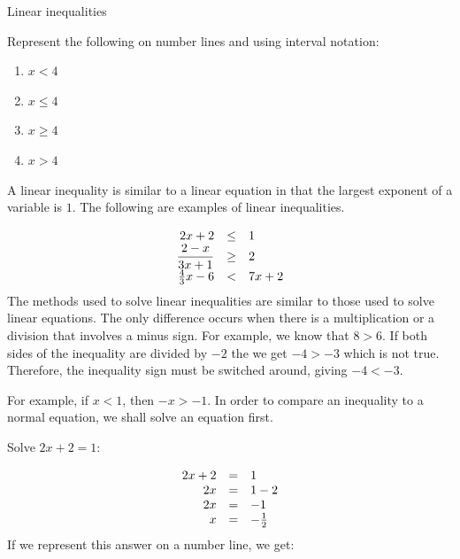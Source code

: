 \begin{activity}{Linear inequalities}
{
Represent the following on number lines and using interval notation:
\begin{enumerate}[noitemsep, label=\textbf{\arabic*}. ] 
\item $x<4$
\item $x\leq 4$
\item $x\geq 4$
\item $x>4$
\end{enumerate}
}
\end{activity}
A linear inequality is similar to a linear equation in that the largest exponent of a variable is $1$. The following are examples of linear inequalities.\par 

\begin{equation*}
\begin{array}{ccc}\hfill 2x+2& \leq& 1\hfill \\ \hfill \dfrac{2-x}{3x+1}&\geq& 2\hfill \\ \hfill \frac{4}{3}x-6&<& 7x+2\hfill \end{array}
\end{equation*}
The methods used to solve linear inequalities are similar to those used to
solve linear equations. The only difference occurs when there is a
multiplication or a division that involves a minus sign. For example, we know
that $8>6$. If both sides of the inequality are divided by $-2$ the we get $-4 > -3$ which is not true. Therefore, the inequality sign must be switched around, giving
$-4<-3$.\par


For example, if $x<1$, then $-x>-1$.
In order to compare an inequality to a normal equation, we shall solve an equation first. \par
Solve $2x+2=1$:

\begin{equation*}
\begin{array}{ccl}\hfill 2x+2& =& 1\hfill \\ \hfill 2x& =& 1-2\hfill \\ \hfill 2x& =& -1\hfill \\ \hfill x& =& -\frac{1}{2}\hfill \end{array}
\end{equation*}
If we represent this answer on a number line, we get:
\\ 


